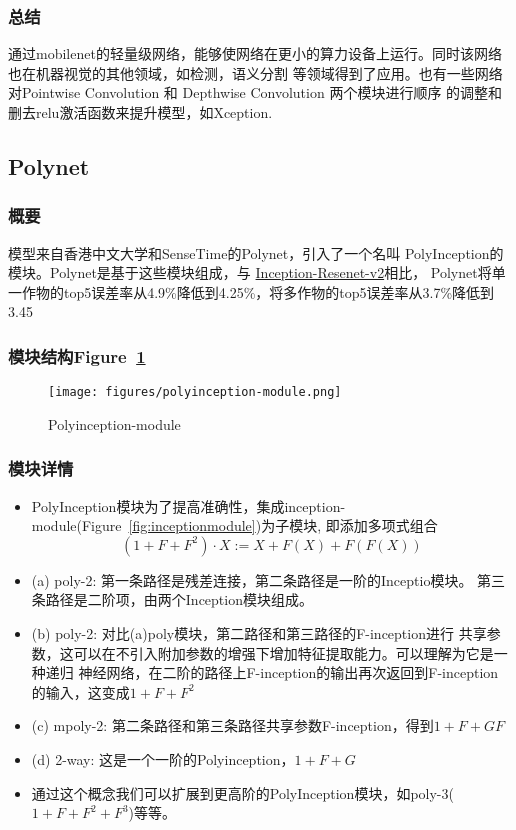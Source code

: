 \documentclass{article}
\begin{document}
\begin{CJK}{UTF8}{gbsn}
\subsubsection{总结}
通过mobilenet的轻量级网络，能够使网络在更小的算力设备上运行。同时该网络也在机器视觉的其他领域，如检测，语义分割
等领域得到了应用。也有一些网络对Pointwise Convolution 和 Depthwise Convolution 两个模块进行顺序
的调整和删去relu激活函数来提升模型，如Xception.


\subsection{Polynet}
\subsubsection{概要}
模型来自香港中文大学和SenseTime的Polynet，引入了一个名叫
PolyInception的模块。Polynet是基于这些模块组成，与
\href{https://towardsdatascience.com/review-inception-v4-evolved-from-googlenet-merged-with-resnet-idea-image-classification-5e8c339d18bc}{Inception-Resenet-v2}相比，
Polynet将单一作物的top5误差率从4.9\%降低到4.25\%，将多作物的top5误差率从3.7\%降低到3.45%


\subsubsection{模块结构Figure~\ref{fig:PIM}}
\begin{figure}
    \centering
    \texttt{[image: figures/polyinception-module.png]}
    \caption{Polyinception-module}
    \label{fig:PIM}
\end{figure}


\subsubsection{模块详情}
    \begin{itemize}
        \item PolyInception模块为了提高准确性，集成inception-module(Figure~\ref{fig:inceptionmodule})为子模块,
        即添加多项式组合
        \begin{equation}
            (1+F+F^2)\cdot X:= X + F(X) + F(F(X))
        \end{equation}
        \item (a) poly-2: 第一条路径是残差连接，第二条路径是一阶的Inceptio模块。
            第三条路径是二阶项，由两个Inception模块组成。
        \item (b) poly-2: 对比(a)poly模块，第二路径和第三路径的F-inception进行
            共享参数，这可以在不引入附加参数的增强下增加特征提取能力。可以理解为它是一种递归
            神经网络，在二阶的路径上F-inception的输出再次返回到F-inception的输入，这变成$1+F+F^2$
        \item (c) mpoly-2: 第二条路径和第三条路径共享参数F-inception，得到$1+F+GF$
        \item (d) 2-way: 这是一个一阶的Polyinception，$1+F+G$
        \item 通过这个概念我们可以扩展到更高阶的PolyInception模块，如poly-3($1+F+F^2+F^3$)等等。
    \end{itemize}



\end{CJK}
\end{document}
